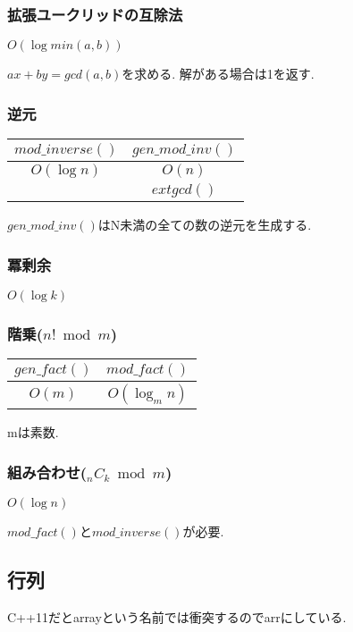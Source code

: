 \documentclass[9pt,twocolumn,a4paper,landscape]{extarticle}
\begin{document}
\subsubsection{拡張ユークリッドの互除法}
$O(\log min(a,b))$\par
$ax+by=gcd(a,b)$を求める. 解がある場合は1を返す.


\subsubsection{逆元}
\begin{table}[htb]
  \begin{tabular}{|c|c|} \hline
    $mod\_inverse()$ & $gen\_mod\_inv()$ \\ \hline
    $O(\log n)$ & $O(n)$ \\ \hline
     & $extgcd()$ \\ \hline
  \end{tabular}
\end{table}
$gen\_mod\_inv()$はN未満の全ての数の逆元を生成する.


\subsubsection{冪剰余}
$O(\log k)$\par


\subsubsection{階乗($n! \bmod m$)}
\begin{table}[htb]
  \begin{tabular}{|c|c|} \hline
    $gen\_fact()$ & $mod\_fact()$ \\ \hline
    $O(m)$ & $O(\log_{m} n)$ \\ \hline
  \end{tabular}
\end{table}
mは素数.


\subsubsection{組み合わせ($_nC_k \bmod m$)}
$O(\log n)$\par
$mod\_fact()$と$mod\_inverse()$が必要.


\subsection{行列}
C++11だとarrayという名前では衝突するのでarrにしている.\par

\end{document}
